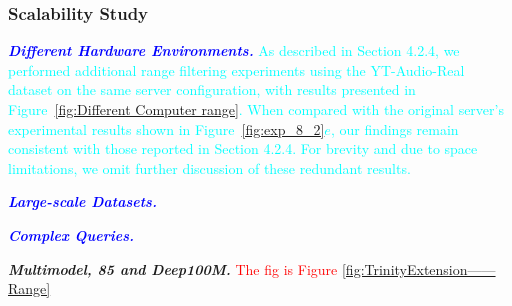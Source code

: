 \documentclass[sigconf, nonacm]{acmart}
\begin{document}
	\subsubsection{Scalability Study}
		
	\textit{\textbf{\textcolor{blue}{Different Hardware Environments.}}}
	\textcolor{cyan}{As described in Section 4.2.4, we performed additional range filtering experiments using the YT-Audio-Real dataset on the same server configuration, with results presented in Figure~\ref{fig:Different Computer range}. When compared with the original server's experimental results shown in Figure~\ref{fig:exp_8_2}$e$, our findings remain consistent with those reported in Section 4.2.4. For brevity and due to space limitations, we omit further discussion of these redundant results.}
	
	\textit{\textbf{\textcolor{blue}{Large-scale Datasets.}}} 
	
	\textit{\textbf{\textcolor{blue}{Complex Queries.}}}
	
	\textit{\textbf{Multimodel, 85 and Deep100M.}} \textcolor{red}{The fig is Figure \ref{fig:TrinityExtension——Range}}
	
\end{document}

